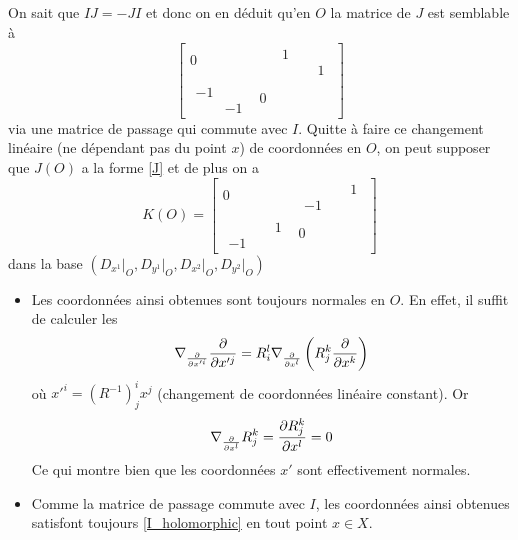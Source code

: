 \documentclass[11pt,draft,twocolumn,makeidx]{amsart}
\numberwithin{equation}{subsection}
\begin{document}
\subsection{}On sait que $IJ=-JI$ et donc on en déduit qu'en $O$ la matrice de $J$ est semblable à
\begin{equation}\label{J}
\left[
\begin{array}{c|c}
 0 &  \begin{matrix}
 \phantom{-}1 &  \\ 
 & \phantom{-}1
\end{matrix} \\ \hline
 \begin{matrix} 
-1 &  \\ 
 & -1
\end{matrix}  & 0 
\end{array}
\right]
\end{equation} via une matrice de passage qui commute avec $I$.
Quitte à faire ce changement linéaire (ne dépendant pas du point $x$) de coordonnées en $O$, on peut supposer que $J(O)$ a la forme \eqref{J}  et de plus on a
\begin{equation}
K(O) = 
\left[
\begin{array}{c|c}
 0 &  \begin{matrix}
 & \phantom{-}1  \\ 
 -1 & 
\end{matrix} \\ \hline
\begin{matrix}
 & \phantom{-}1  \\ 
 -1 & 
\end{matrix}  & 0 
\end{array}
\right]
\end{equation}
dans la base $(D_{x^1}\vert_O, D_{y^1}\vert_O, D_{x^2}\vert_O, D_{y^2}\vert_O)$
\begin{itemize}
\item Les coordonnées ainsi obtenues sont toujours normales en $O$. \label{stays_normal}
En effet, il suffit de calculer les
\[
\nabla_{\frac{\partial}{\partial x'^i}} \dfrac{\partial{}}{\partial{x'^j}} = R_i^l \nabla_{\frac{\partial}{\partial x^l}} \left(R^k_j\dfrac{\partial{}}{\partial{x^k}}\right)
\]
où $x'^i = (R^{-1})^i_j x^j$ (changement de coordonnées linéaire constant). Or
\[
\nabla_{\frac{\partial}{\partial x^l}} R^k_j = \dfrac{\partial{R^k_j}}{\partial{x^l}} = 0
\]
Ce qui montre bien que les coordonnées $x'$ sont effectivement normales.
\item Comme la matrice de passage commute avec $I$, les coordonnées ainsi obtenues satisfont toujours  \eqref{I_holomorphic} en tout point $x\in X$.
\end{itemize}
\end{document}
